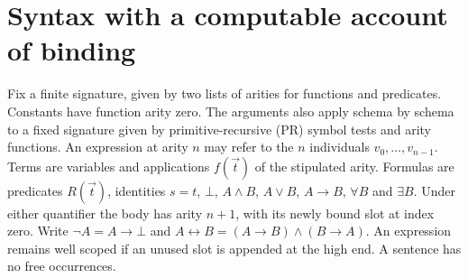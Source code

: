 \section{Syntax with a computable account of binding}\label{sec:binding}

Fix a finite signature, given by two lists of arities for functions and
predicates. Constants have function arity zero. The arguments also apply
schema by schema to a fixed signature given by primitive-recursive (PR)
symbol tests and arity functions. An expression at arity $n$ may refer to
the $n$ individuals $v_0,\ldots,v_{n-1}$. Terms are variables and
applications $f(\vec t)$ of the stipulated arity. Formulas are predicates
$R(\vec t)$, identities $s=t$, $\bot$, $A\wedge B$, $A\vee B$, $A\to B$,
$\forall B$ and $\exists B$. Under either quantifier the body has arity
$n+1$, with its newly bound slot at index zero. Write
$\neg A=A\to\bot$ and $A\leftrightarrow B=(A\to B)\wedge(B\to A)$.
An expression remains well scoped if an unused slot is appended at
the high end. A sentence has no free occurrences.

